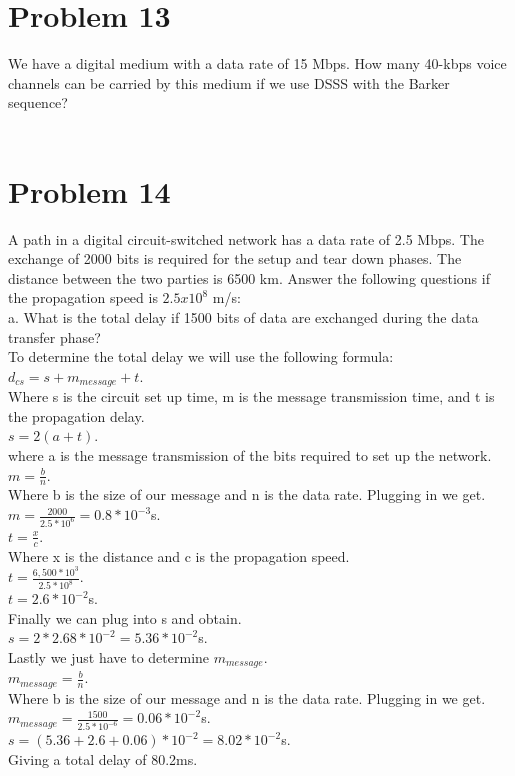 \documentclass{article}
\begin{document}
\section*{Problem 13}
We have a digital medium with a data rate of 15 Mbps. How many 40-kbps voice channels can be
carried by this medium if we use DSSS with the Barker sequence?\\\\

\section*{Problem 14}
A path in a digital circuit-switched network has a data rate of 2.5 Mbps. The exchange of 2000 bits
is required for the setup and tear down phases. The distance between the two parties is 6500 km.
Answer the following questions if the propagation speed is $2.5x10^8$ m/s:\\

\subP a. What is the total delay if 1500 bits of data are exchanged during the data transfer phase?\\
To determine the total delay we will use the following formula:\\
$d_{cs} = s + m_{message} + t$.\\
Where s is the circuit set up time, m is the message transmission time, and t is the propagation delay.\\
$s = 2(a + t)$.\\
where a is the message transmission of the bits required to set up the network.\\
$m = \frac{b}{n}$.\\
Where b is the size of our message and n is the data rate. Plugging in we get.\\
$m = \frac{2000}{2.5*10^{6}} = 0.8 * 10^{-3}$s.\\
$t = \frac{x}{c}$.\\
Where x is the distance and c is the propagation speed.\\
$t = \frac{6,500 * 10^{3}}{2.5*10^{8}}$.\\
$t = 2.6 * 10^{-2}$s.\\
Finally we can plug into s and obtain.\\
$s = 2 * 2.68 * 10^{-2} = 5.36*10^{-2}$s.\\
Lastly we just have to determine $m_{message}$.\\
$m_{message} = \frac{b}{n}$.\\
Where b is the size of our message and n is the data rate. Plugging in we get.\\
$m_{message} = \frac{1500}{2.5 * 10^{-6}} = 0.06 * 10^{-2}$s.\\
$s = (5.36 + 2.6 + 0.06)*10^{-2} = 8.02 * 10^{-2}$s.\\
Giving a total delay of 80.2ms.\\
\end{document}

